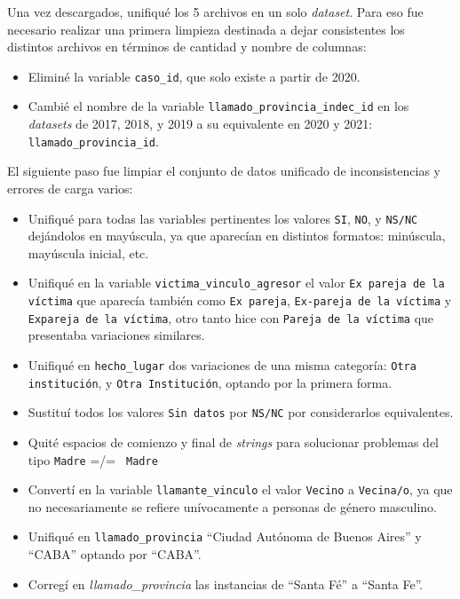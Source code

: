 \documentclass[10 pt]{article}
\begin{document}
Una vez descargados, unifiqué los 5 archivos en un solo \textit{dataset}. Para eso fue necesario realizar una primera limpieza destinada a dejar consistentes los distintos archivos en términos de cantidad y nombre de columnas:

\begin{itemize}
    \item Eliminé la variable \texttt{caso\_id}, que solo existe a partir de 2020.
    \item Cambié el nombre de la variable \texttt{llamado\_provincia\_indec\_id} en los \textit{datasets} de 2017, 2018, y 2019 a su equivalente en 2020 y 2021: \texttt{llamado\_provincia\_id}.
\end{itemize}

El siguiente paso fue limpiar el conjunto de datos unificado de inconsistencias y errores de carga varios: 
\begin{itemize}
    \item Unifiqué para todas las variables pertinentes los valores \texttt{SI}, \texttt{NO}, y \texttt{NS/NC} dejándolos en mayúscula, ya que aparecían en distintos formatos: minúscula, mayúscula inicial, etc.
    \item Unifiqué en la variable \texttt{victima\_vinculo\_agresor} el valor \texttt{Ex pareja de la víctima} que aparecía también como \texttt{Ex pareja}, \texttt{Ex-pareja de la víctima} y \texttt{Expareja de la víctima}, otro tanto hice con \texttt{Pareja de la víctima} que presentaba variaciones similares.
    \item Unifiqué en \texttt{hecho\_lugar} dos variaciones de una misma categoría: \texttt{Otra institución}, y \texttt{Otra Institución}, optando por la primera forma.
    \item Sustituí todos los valores \texttt{Sin datos} por \texttt{NS/NC} por considerarlos equivalentes.
    \item Quité espacios de comienzo y final de \textit{strings} para solucionar problemas del tipo \texttt{Madre} =/= \texttt{  Madre} 
    \item Convertí en la variable \texttt{llamante\_vinculo} el valor \texttt{Vecino} a \texttt{Vecina/o}, ya que no necesariamente se refiere unívocamente a personas de género masculino.
    \item Unifiqué en \texttt{llamado\_provincia} “Ciudad Autónoma de Buenos Aires” y “CABA” optando por “CABA”. 
    \item Corregí en \textit{llamado\_provincia }las instancias de “Santa Fé” a “Santa Fe”.

\end{itemize}
\end{document}
